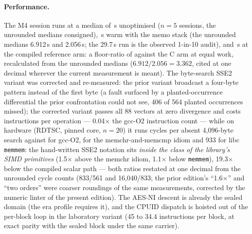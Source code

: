 \documentclass[10pt,a4paper]{article}
\newcommand{\code}[1]{\texttt{\small #1}}
\begin{document}
\paragraph{Performance.} The M4 session runs at a median of
\mquatreAvantMediane{}\,s unoptimised ($n{=}5$ sessions, the unrounded
medians consigned), \mquatreChaudMediane{}\,s warm
with the memo stack (the unrounded medians 6.912\,s and 2.056\,s; the
29.7\,s run is the observed 1-in-10 audit), and \mquatreBrasC{}\,s at
the compiled reference arm: a floor-ratio of \mquatreRatioChaud{} against
the C arm at equal work, recalculated from the unrounded medians
($6.912/2.056 = 3.362$, cited at one decimal wherever the current
measurement is meant). The byte-search SSE2 variant was
corrected and re-measured: the prior variant broadcast a four-byte
pattern instead of the first byte (a fault surfaced by a
planted-occurrence differential the prior confrontation could not
see, 406 of 564 planted occurrences missed); the corrected variant
passes all 88 vectors at zero divergence and costs \sseDeuxVdeuxInstructions{}
instructions per operation --- 0.04$\times$ the gcc-O2 instruction
count --- while on hardware (RDTSC, pinned core, $n{=}20$) it runs
\sseDeuxTempsReel{} cycles per absent 4{,}096-byte search against
\gccODeuxTempsReel{} for gcc-O2, \idiomeMemchrTempsReel{} for the
memchr-and-memcmp idiom and 933 for libc \code{memmem}: the
hand-written SSE2 notation sits \emph{inside the class of the library's
SIMD primitives} (1.5$\times$ above the memchr idiom, 1.1$\times$
below \code{memmem}), 19.3$\times$ below the compiled scalar path
--- both ratios restated at one decimal from the unrounded cycle
counts (833/561 and 16{,}040/833; the prior edition's ``1.6$\times$''
and ``two orders'' were coarser roundings of the same measurements,
corrected by the numeric linter of the present edition). The
AES-NI descent is already the sealed domain (the era profile requires
it), and the CPUID dispatch is hoisted out of the per-block loop in
the laboratory variant (45 to 34.4 instructions per block, at exact
parity with the sealed block under the same carrier).
\end{document}
